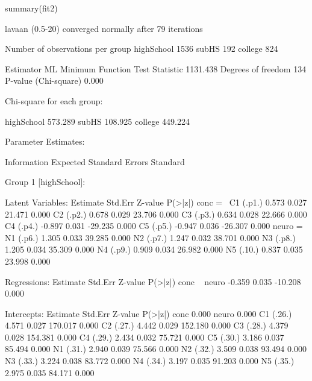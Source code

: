 \begin{Schunk}
\begin{Sinput}
 summary(fit2)
\end{Sinput}
\begin{Soutput}
lavaan (0.5-20) converged normally after  79 iterations

  Number of observations per group         
  highSchool                                      1536
  subHS                                            192
  college                                          824

  Estimator                                         ML
  Minimum Function Test Statistic             1131.438
  Degrees of freedom                               134
  P-value (Chi-square)                           0.000

Chi-square for each group:

  highSchool                                   573.289
  subHS                                        108.925
  college                                      449.224

Parameter Estimates:

  Information                                 Expected
  Standard Errors                             Standard


Group 1 [highSchool]:

Latent Variables:
                   Estimate  Std.Err  Z-value  P(>|z|)
  conc =~                                             
    C1      (.p1.)    0.573    0.027   21.471    0.000
    C2      (.p2.)    0.678    0.029   23.706    0.000
    C3      (.p3.)    0.634    0.028   22.666    0.000
    C4      (.p4.)   -0.897    0.031  -29.235    0.000
    C5      (.p5.)   -0.947    0.036  -26.307    0.000
  neuro =~                                            
    N1      (.p6.)    1.305    0.033   39.285    0.000
    N2      (.p7.)    1.247    0.032   38.701    0.000
    N3      (.p8.)    1.205    0.034   35.309    0.000
    N4      (.p9.)    0.909    0.034   26.982    0.000
    N5      (.10.)    0.837    0.035   23.998    0.000

Regressions:
                   Estimate  Std.Err  Z-value  P(>|z|)
  conc ~                                              
    neuro            -0.359    0.035  -10.208    0.000

Intercepts:
                   Estimate  Std.Err  Z-value  P(>|z|)
    conc              0.000                           
    neuro             0.000                           
    C1      (.26.)    4.571    0.027  170.017    0.000
    C2      (.27.)    4.442    0.029  152.180    0.000
    C3      (.28.)    4.379    0.028  154.381    0.000
    C4      (.29.)    2.434    0.032   75.721    0.000
    C5      (.30.)    3.186    0.037   85.494    0.000
    N1      (.31.)    2.940    0.039   75.566    0.000
    N2      (.32.)    3.509    0.038   93.494    0.000
    N3      (.33.)    3.224    0.038   83.772    0.000
    N4      (.34.)    3.197    0.035   91.203    0.000
    N5      (.35.)    2.975    0.035   84.171    0.000


\end{Soutput}
\end{Schunk}
